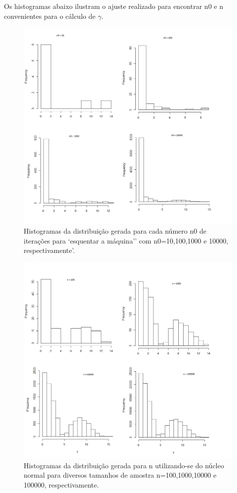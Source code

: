 \documentclass[a4paper,10pt]{article}
\begin{document}
Os histogramas abaixo ilustram o ajuste realizado para encontrar n0 e n convenientes para o cálculo de $\gamma$.
\begin{figure}
\centering
\includegraphics[width=1.2\textwidth]{n0.jpg}
\caption{\label{fig:garf2}Histogramas da distribuição gerada para cada número n0 de iterações para `esquentar a máquina'' com n0=10,100,1000 e 10000, respectivamente'. }
\end{figure}

\begin{figure}
\centering
\includegraphics[width=1.2\textwidth]{n.jpg}
\caption{\label{fig:garf2}Histogramas da distribuição gerada para n utilizando-se do núcleo normal para diversos tamanhos de amostra n=100,1000,10000 e 100000, respectivamente. }
\end{figure}
\end{document}
